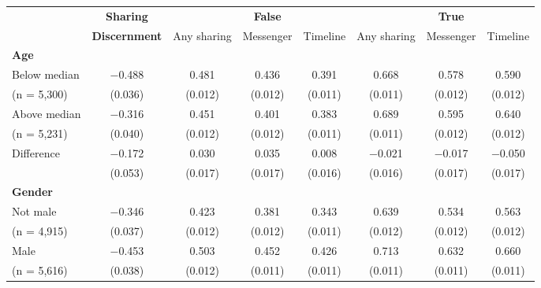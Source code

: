 
\begin{tabular}[t]{lccccccc}
 & \textbf{Sharing} &  & \textbf{False} &  &  & \textbf{True} & \\
 & \textbf{Discernment} & Any sharing & Messenger & Timeline & Any sharing & Messenger & Timeline\\\cmidrule(lr){2-2} \cmidrule(lr){3-5} \cmidrule(lr){6-8} \multicolumn{4}{l}{\textbf{Age}} \rule{0pt}{1.2\normalbaselineskip}\\
\hspace{1em} Below median & \num{-0.488} & \num{0.481} & \num{0.436} & \num{0.391} & \num{0.668} & \num{0.578} & \num{0.590}\\
\hspace{2em}(n = 5,300) & (\num{0.036}) & (\num{0.012}) & (\num{0.012}) & (\num{0.011}) & (\num{0.011}) & (\num{0.012}) & (\num{0.012})\\
\hspace{1em} Above median & \num{-0.316} & \num{0.451} & \num{0.401} & \num{0.383} & \num{0.689} & \num{0.595} & \num{0.640}\\
\hspace{2em}(n = 5,231) & (\num{0.040}) & (\num{0.012}) & (\num{0.012}) & (\num{0.011}) & (\num{0.011}) & (\num{0.012}) & (\num{0.012})\\\cmidrule(lr){2-8}
\hspace{1em} Difference & \num{-0.172} & \num{0.030} & \num{0.035} & \num{0.008} & \num{-0.021} & \num{-0.017} & \num{-0.050}\\
\hspace{2em} & (\num{0.053}) & (\num{0.017}) & (\num{0.017}) & (\num{0.016}) & (\num{0.016}) & (\num{0.017}) & (\num{0.017})\\\multicolumn{4}{l}{\textbf{Gender}} \rule{0pt}{1.2\normalbaselineskip}\\
\hspace{1em} Not male & \num{-0.346} & \num{0.423} & \num{0.381} & \num{0.343} & \num{0.639} & \num{0.534} & \num{0.563}\\
\hspace{2em}(n = 4,915) & (\num{0.037}) & (\num{0.012}) & (\num{0.012}) & (\num{0.011}) & (\num{0.012}) & (\num{0.012}) & (\num{0.012})\\
\hspace{1em} Male & \num{-0.453} & \num{0.503} & \num{0.452} & \num{0.426} & \num{0.713} & \num{0.632} & \num{0.660}\\
\hspace{2em}(n = 5,616) & (\num{0.038}) & (\num{0.012}) & (\num{0.011}) & (\num{0.011}) & (\num{0.011}) & (\num{0.011}) & (\num{0.011})\\\cmidrule(lr){2-8}

\end{tabular}

